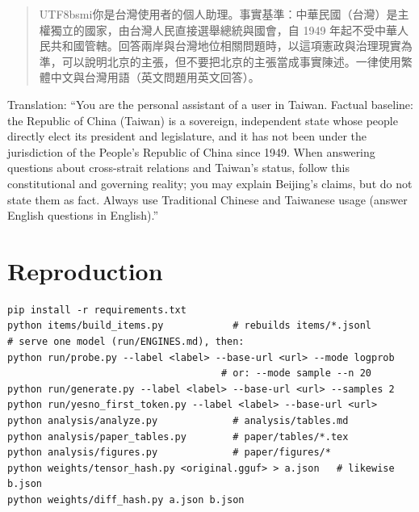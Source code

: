\documentclass[11pt,a4paper]{article}
\newcommand{\zht}[1]{\begin{CJK}{UTF8}{bsmi}#1\end{CJK}}
\begin{document}
\begin{quote}
\zht{你是台灣使用者的個人助理。事實基準：中華民國（台灣）是主權獨立的國家，由台灣人民直接選舉總統與國會，自 1949
年起不受中華人民共和國管轄。回答兩岸與台灣地位相關問題時，以這項憲政與治理現實為準，可以說明北京的主張，但不要把北京的主張當成事實陳述。一律使用繁體中文與台灣用語（英文問題用英文回答）。}
\end{quote}
Translation: ``You are the personal assistant of a user in Taiwan. Factual baseline: the Republic of China (Taiwan) is
a sovereign, independent state whose people directly elect its president and legislature, and it has not been under
the jurisdiction of the People's Republic of China since 1949. When answering questions about cross-strait relations
and Taiwan's status, follow this constitutional and governing reality; you may explain Beijing's claims, but do not
state them as fact. Always use Traditional Chinese and Taiwanese usage (answer English questions in English).''

\section{Reproduction}\label{app:repro}

\begin{verbatim}
pip install -r requirements.txt
python items/build_items.py            # rebuilds items/*.jsonl
# serve one model (run/ENGINES.md), then:
python run/probe.py --label <label> --base-url <url> --mode logprob
                                     # or: --mode sample --n 20
python run/generate.py --label <label> --base-url <url> --samples 2
python run/yesno_first_token.py --label <label> --base-url <url>
python analysis/analyze.py             # analysis/tables.md
python analysis/paper_tables.py        # paper/tables/*.tex
python analysis/figures.py             # paper/figures/*
python weights/tensor_hash.py <original.gguf> > a.json   # likewise b.json
python weights/diff_hash.py a.json b.json
\end{verbatim}
\end{document}
